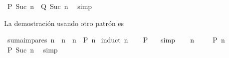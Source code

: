 \begin{isabellebody}
\ {\isachardoublequoteopen}{\isacharquery}P\ {\isacharparenleft}Suc\ n{\isacharparenright}\ {\isacharequal}\ {\isacharquery}Q\ {\isacharparenleft}Suc\ n{\isacharparenright}{\isachardoublequoteclose}\ \isamarkupfalse%
\ simp\isanewline
{}\isamarkupfalse%
%
\endisatagproof
{\isafoldproof}%
%
\isadelimproof
%
\endisadelimproof
%
\begin{isamarkuptext}%
La demostración usando otro patrón es%
\end{isamarkuptext}\isamarkuptrue%
\isamarkupfalse%
\ {\isachardoublequoteopen}suma{\isacharunderscore}impares\ n\ {\isacharequal}\ n\ {\isacharasterisk}\ n{\isachardoublequoteclose}\ {\isacharparenleft}\ {\isachardoublequoteopen}{\isacharquery}P\ n{\isachardoublequoteclose}{\isacharparenright}\isanewline
%
\isadelimproof
%
\endisadelimproof
%
\isatagproof
{}\isamarkupfalse%
\ {\isacharparenleft}induct\ n{\isacharparenright}\isanewline
\ \ \isamarkupfalse%
\ {\isachardoublequoteopen}{\isacharquery}P\ {}{\isachardoublequoteclose}\ \isamarkupfalse%
\ simp\isanewline
{}\isamarkupfalse%
\isanewline
\ \ \isamarkupfalse%
\ n\ \isanewline
\ \ \isamarkupfalse%
\ {\isachardoublequoteopen}{\isacharquery}P\ n{\isachardoublequoteclose}\isanewline
\ \ \isamarkupfalse%
\ \isamarkupfalse%
\ {\isachardoublequoteopen}{\isacharquery}P\ {\isacharparenleft}Suc\ n{\isacharparenright}{\isachardoublequoteclose}\ \isamarkupfalse%
\ simp\isanewline
{}\isamarkupfalse%
\isanewline
%
\endisatagproof
{\isafoldproof}%
%
\isadelimproof
%
\endisadelimproof
%
\isadelimtheory
%
\endisadelimtheory
%
\isatagtheory
%
\endisatagtheory
{\isafoldtheory}%
%
\isadelimtheory
%
\endisadelimtheory
%
\end{isabellebody}%
\endinput
